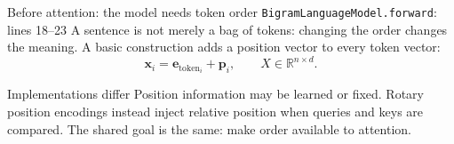 \begin{frame}{Before attention: the model needs token order
  \hfill{\tiny \texttt{BigramLanguageModel.forward}: lines 18--23}}
  \small
  A sentence is not merely a bag of tokens: changing the order changes the
  meaning. A basic construction adds a position vector to every token vector:
  \[
    \mathbf x_i=\mathbf e_{\text{token}_i}+\mathbf p_i,
    \qquad X\in\mathbb R^{n\times d}.
  \]

  \begin{center}
  \end{center}

  \begin{block}{Implementations differ}
    Position information may be learned or fixed. Rotary position encodings
    instead inject relative position when queries and keys are compared. The
    shared goal is the same: make order available to attention.
  \end{block}
\end{frame}

